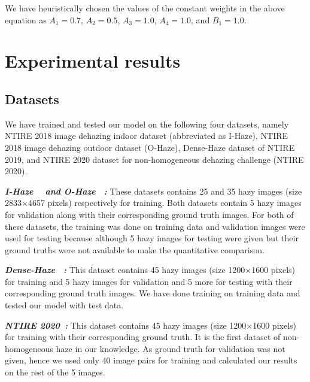 \documentclass[runningheads]{llncs}
\begin{document}
We have heuristically chosen the values of the constant weights in the above equation as $A_1 = 0.7$, $A_2 = 0.5$, $A_3 = 1.0$, $A_4 = 1.0$, and $B_1 = 1.0$.


\section{Experimental results}\label{sec:results}

\subsection{Datasets}
We have trained and tested our model on the following four datasets, namely NTIRE 2018 image dehazing indoor dataset (abbreviated as I-Haze), NTIRE 2018 image dehazing outdoor dataset (O-Haze), Dense-Haze dataset of NTIRE 2019, and NTIRE 2020 dataset for non-homogeneous dehazing challenge (NTIRE 2020).

\textbf{\textit{I-Haze ~\cite{DBLP:journals/corr/abs-1804-05091} and O-Haze ~\cite{ancuti2018haze}:}} These datasets contains 25 and 35 hazy images (size 2833$\times$4657 pixels) respectively for training. Both datasets contain 5 hazy images for validation along with their corresponding ground truth images. For both of these datasets, the training was done on training data and validation images were used for testing because although 5 hazy images for testing were given but their ground truths were not available to make the quantitative comparison. 

\textbf{\textit{Dense-Haze ~\cite{ancuti2019dense}:}} This dataset contains 45 hazy images (size 1200$\times$1600 pixels) for training and 5 hazy images for validation and 5 more for testing with their corresponding ground truth images. We have done training on training data and tested our model with test data.

\textbf{\textit{NTIRE 2020~\cite{NTIRE2020}:}} This dataset contains 45 hazy images (size 1200$\times$1600 pixels) for training with their corresponding ground truth. It is the first dataset of non-homogeneous haze in our knowledge. As ground truth for validation was not given, hence we used only 40 image pairs for training and calculated our results on the rest of the 5 images.
\end{document}
